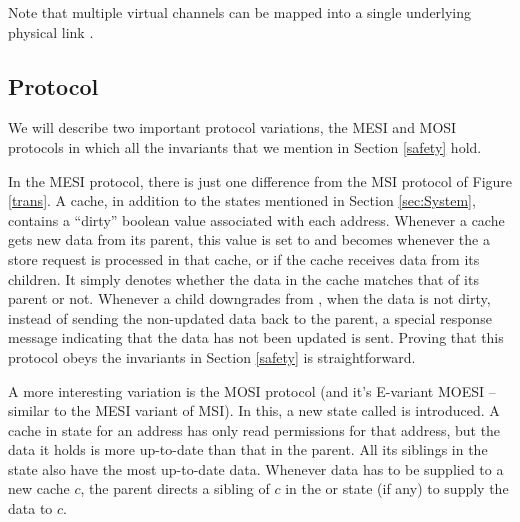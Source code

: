Note that multiple virtual channels can be mapped into a single underlying
physical link \cite{noc-funda}.


\subsection{Protocol}
We will describe two important protocol variations, the MESI and MOSI protocols
in which all the invariants that we mention in Section \ref{safety} hold.

In the MESI protocol, there is just one difference from the MSI protocol of
Figure \ref{trans}. A cache, in addition to the states mentioned in Section
\ref{sec:System}, contains a ``dirty'' boolean value associated with each
address.  Whenever a cache gets new data from its parent, this value is set to
\False{} and becomes \True{} whenever the a store request is processed in that
cache, or if the cache receives data from its children. It simply denotes
whether the data in the cache matches that of its parent or not.  Whenever a
child downgrades from \Mo{}, when the data is not dirty, instead of sending the
non-updated data back to the parent, a special response message indicating that
the data has not been updated is sent. Proving that this protocol obeys the
invariants in Section \ref{safety} is straightforward.

A more interesting variation is the MOSI protocol (and it's E-variant MOESI --
similar to the MESI variant of MSI). In this, a new state called \Ow{} is
introduced. A cache in \Ow{} state for an address has only read permissions for
that address, but the data it holds is more up-to-date than that in the parent.
All its siblings in the \Sh{} state also have the most up-to-date data.
Whenever data has to be supplied to a new cache $c$, the parent directs a
sibling of $c$ in the \Ow{} or \Mo{} state (if any) to supply the data to $c$.

